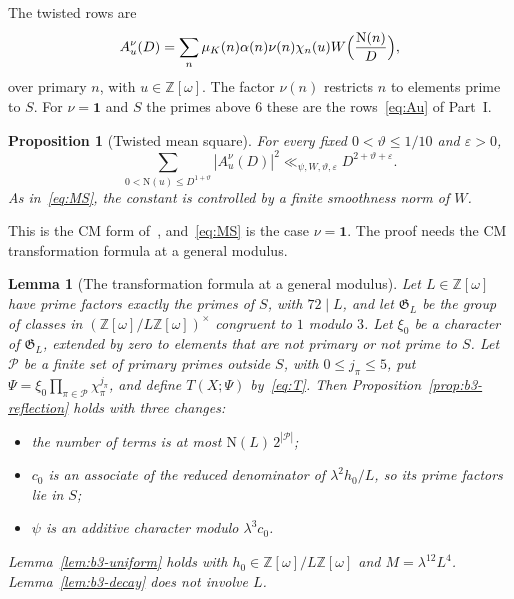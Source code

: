 \documentclass[11pt]{article}
\numberwithin{equation}{section}
\newcommand{\OO}{\mathbb Z[\omega]}
\newcommand{\N}{\mathrm N}
\newcommand{\muk}{\mu_K}
\newcommand{\ind}{\mathbf1}
\newtheorem{proposition}{Proposition}
\newtheorem{lemma}{Lemma}
\begin{document}
The twisted rows are
\begin{equation}\label{eq:d193}
 A_u^\nu(D)=\sum_n\muk(n)\alpha(n)\nu(n)\chi_n(u)W\Bigl(\frac{\N(n)}D\Bigr),
\end{equation}
over primary $n$, with $u\in\OO$. The factor $\nu(n)$ restricts $n$ to elements prime to $S$. For $\nu=\ind$
and $S$ the primes above $6$ these are the rows~\eqref{eq:Au} of Part~I.

\begin{proposition}[Twisted mean square]\label{prop:s6-ms}
For every fixed $0<\vartheta\le1/10$ and $\varepsilon>0$,
\begin{equation}\label{eq:d194}
 \sum_{0<\N(u)\le D^{1+\vartheta}}|A_u^\nu(D)|^2\ll_{\psi,W,\vartheta,\varepsilon}D^{2+\vartheta+\varepsilon}.
\end{equation}
As in~\eqref{eq:MS}, the constant is controlled by a finite smoothness norm of $W$.
\end{proposition}

This is the CM form of~\cite[Proposition~3.1]{OAI1112}, and~\eqref{eq:MS} is the case $\nu=\ind$. The
proof needs the CM transformation formula at a general modulus.

\begin{lemma}[The transformation formula at a general modulus]\label{lem:s6-reflection}
Let $L\in\OO$ have prime factors exactly the primes of $S$, with $72\mid L$, and let $\mathfrak G_L$ be the
group of classes in $(\OO/L\OO)^\times$ congruent to $1$ modulo $3$. Let $\xi_0$ be a character of
$\mathfrak G_L$, extended by zero to elements that are not primary or not prime to $S$. Let $\mathcal P$ be a
finite set of primary primes outside $S$, with $0\le j_\pi\le5$, put
$\Psi=\xi_0\prod_{\pi\in\mathcal P}\chi_\pi^{j_\pi}$, and define $T(X;\Psi)$ by~\eqref{eq:T}. Then
Proposition~\ref{prop:b3-reflection} holds with three changes:
\begin{itemize}
\item the number of terms is at most $\N(L)\,2^{|\mathcal P|}$;
\item $c_0$ is an associate of the reduced denominator of $\lambda^2h_0/L$, so its prime factors lie in $S$;
\item $\psi$ is an additive character modulo $\lambda^3c_0$.
\end{itemize}
Lemma~\ref{lem:b3-uniform} holds with $h_0\in\OO/L\OO$ and $M=\lambda^{12}L^4$. Lemma~\ref{lem:b3-decay} does
not involve $L$.
\end{lemma}
\end{document}
